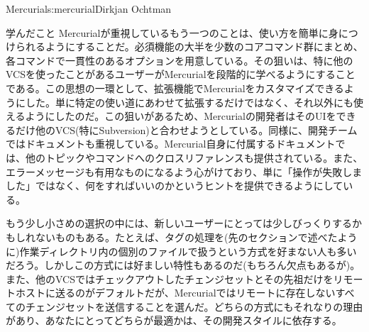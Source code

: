 \begin{aosachapter}{Mercurial}{s:mercurial}{Dirkjan Ochtman}
\begin{aosasect1}{学んだこと}
Mercurialが重視しているもう一つのことは、使い方を簡単に身につけられるようにすることだ。必須機能の大半を少数のコアコマンド群にまとめ、各コマンドで一貫性のあるオプションを用意している。その狙いは、特に他のVCSを使ったことがあるユーザーがMercurialを段階的に学べるようにすることである。この思想の一環として、拡張機能でMercurialをカスタマイズできるようにした。単に特定の使い道にあわせて拡張するだけではなく、それ以外にも使えるようにしたのだ。この狙いがあるため、Mercurialの開発者はそのUIをできるだけ他のVCS(特にSubversion)と合わせようとしている。同様に、開発チームではドキュメントも重視している。Mercurial自身に付属するドキュメントでは、他のトピックやコマンドへのクロスリファレンスも提供されている。また、エラーメッセージも有用なものになるよう心がけており、単に「操作が失敗しました」ではなく、何をすればいいのかというヒントを提供できるようにしている。

もう少し小さめの選択の中には、新しいユーザーにとっては少しびっくりするかもしれないものもある。たとえば、タグの処理を(先のセクションで述べたように)作業ディレクトリ内の個別のファイルで扱うという方式を好まない人も多いだろう。しかしこの方式には好ましい特性もあるのだ(もちろん欠点もあるが)。また、他のVCSではチェックアウトしたチェンジセットとその先祖だけをリモートホストに送るのがデフォルトだが、Mercurialではリモートに存在しないすべてのチェンジセットを送信することを選んだ。どちらの方式にもそれなりの理由があり、あなたにとってどちらが最適かは、その開発スタイルに依存する。


\end{aosasect1}
\end{aosachapter}

